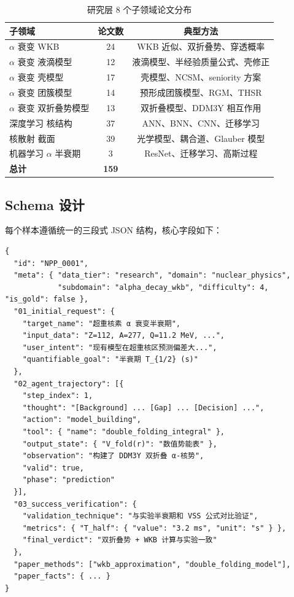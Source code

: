 \documentclass[12pt,a4paper]{article}
\begin{document}
\begin{table}[h]
\centering
\caption{研究层 8 个子领域论文分布}
\label{tab:subdomains}
\begin{tabular}{lcc}
\toprule
\textbf{子领域} & \textbf{论文数} & \textbf{典型方法} \\
\midrule
$\alpha$ 衰变 WKB & 24 & WKB 近似、双折叠势、穿透概率 \\
$\alpha$ 衰变 液滴模型 & 12 & 液滴模型、半经验质量公式、壳修正 \\
$\alpha$ 衰变 壳模型 & 17 & 壳模型、NCSM、seniority 方案 \\
$\alpha$ 衰变 团簇模型 & 14 & 预形成团簇模型、RGM、THSR \\
$\alpha$ 衰变 双折叠势模型 & 13 & 双折叠模型、DDM3Y 相互作用 \\
深度学习 核结构 & 37 & ANN、BNN、CNN、迁移学习 \\
核散射 截面 & 39 & 光学模型、耦合道、Glauber 模型 \\
机器学习 $\alpha$ 半衰期 & 3 & ResNet、迁移学习、高斯过程 \\
\midrule
\textbf{总计} & \textbf{159} & \\
\bottomrule
\end{tabular}
\end{table}

\subsection{Schema 设计}

每个样本遵循统一的三段式 JSON 结构，核心字段如下：

\begin{verbatim}
{
  "id": "NPP_0001",
  "meta": { "data_tier": "research", "domain": "nuclear_physics",
            "subdomain": "alpha_decay_wkb", "difficulty": 4, "is_gold": false },
  "01_initial_request": {
    "target_name": "超重核素 α 衰变半衰期",
    "input_data": "Z=112, A=277, Q=11.2 MeV, ...",
    "user_intent": "现有模型在超重核区预测偏差大...",
    "quantifiable_goal": "半衰期 T_{1/2} (s)"
  },
  "02_agent_trajectory": [{
    "step_index": 1,
    "thought": "[Background] ... [Gap] ... [Decision] ...",
    "action": "model_building",
    "tool": { "name": "double_folding_integral" },
    "output_state": { "V_fold(r)": "数值势能表" },
    "observation": "构建了 DDM3Y 双折叠 α-核势",
    "valid": true,
    "phase": "prediction"
  }],
  "03_success_verification": {
    "validation_technique": "与实验半衰期和 VSS 公式对比验证",
    "metrics": { "T_half": { "value": "3.2 ms", "unit": "s" } },
    "final_verdict": "双折叠势 + WKB 计算与实验一致"
  },
  "paper_methods": ["wkb_approximation", "double_folding_model"],
  "paper_facts": { ... }
}
\end{verbatim}
\end{document}
